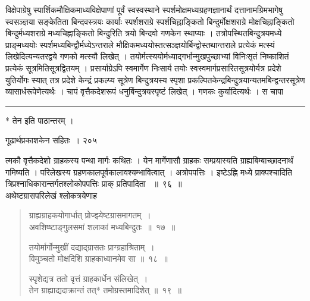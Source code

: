 \documentclass[11pt, openany]{book}
\begin{document}
 विक्षेपाग्रेषु स्पार्शिकमौक्षिकमाध्यविक्षेपाणां पूर्वं स्वस्वस्थाने स्पर्शमोक्षमध्यग्रहणज्ञानार्थं दत्तानामग्रिमभागेषु स्वसञ्ज्ञया सङ्केतिता बिन्दवस्त्रयः कार्याः स्पर्शशराग्रे स्पर्शचिह्नाङ्कितो बिन्दुर्मोक्षशराग्रे मोक्षचिह्नाङ्कितो बिन्दुर्मध्यशराग्रे मध्यचिह्नाङ्कितो बिन्दुरिति त्रयो बिन्दवो गणकेन स्थाप्याः । तत्रोपस्थितबिन्दुत्रयमध्ये प्राङ्मध्ययोः स्पर्शमध्यबिन्द्वौर्मध्येऽन्तराले मौक्षिकमध्ययोस्तत्सञ्ज्ञयोर्बिन्द्वोस्तथान्तराले प्रत्येकं मत्स्यं लिखेदित्यन्यतरद्वये गणको मत्स्यौ लिखेत् । तयोर्मत्स्ययोर्मध्याद्गर्भान्मुखपुच्छाभ्यां विनिःसृतं निष्काशितं प्रत्येकं सूत्रमितिसूत्रद्वितयम् । प्रसार्याग्रेऽपि स्वमार्गेण निःसार्य तयोः स्वस्वमार्गप्रसारितसूत्रयोर्यत्र प्रदेशे युतिर्योगः स्यात् तत्र प्रदेशे केन्द्रं प्रकल्प्य सूत्रेण बिन्दुत्रयस्य स्पृशा प्रकल्पितकेन्द्रबिन्दुत्रयान्यतमबिन्द्वन्तरसूत्रेण व्यासार्धरूपेणेत्यर्थः । चापं वृत्तैकदेशरूपं धनुर्बिन्दुत्रयस्पृष्टं लिखेत् । गणकः कुर्यादित्यर्थः । स चापा\textendash


\noindent \rule{\linewidth}{.5pt}

\begin{center}
 * तेन इति पाठान्तरम् ।
\end{center}

\newpage

 \hspace{3cm} गूढार्थप्रकाशकेन सहितः~। \hfill २०५
\vspace{1cm}


\noindent त्मकौ वृत्तैकदेशो ग्राहकस्य पन्था मार्गः कथितः । येन मार्गेणासौ ग्राहकः सम्प्रयास्यति ग्राह्यबिम्बाच्छादनार्थं गमिष्यति । परिलेखस्य ग्रहणकालपूर्वकालावश्यम्भावित्वात् । अत्रोपपत्तिः । इष्टेऽह्नि मध्ये प्राक्पश्चादिति त्रिप्रश्नाधिकारान्तर्गतश्लोकोपपत्तिः प्राक् प्रतिपादिता ~॥~९६~॥\\
\noindent अथेष्टग्रासपरिलेखं श्लोकत्रयेणाह\textendash



\begin{quote}
{\ssi ग्राह्यग्राहकयोगार्धात् प्रोज्झ्येष्टग्रासमागतम्~।\\
 अवशिष्ष्टाङ्गुलसमां शलाकां मध्यबिन्दुतः~॥~१७~॥

तयोर्मार्गोन्मुखीं दद्याद्ग्रासतः प्राग्ग्रहाश्रिताम्~।\\
विमुञ्चतो मोक्षदिशि ग्राहकाध्वानमेव सा ॥~१८~॥

स्पृशेद्यत्र ततो वृत्तं ग्राहकार्धेन संलिखेत्~।\\
तेन ग्राह्याद्यदाक्रान्तं तत्* तमोग्रस्तमादिशेत् ॥~१९~॥}
\end{quote}
\end{document}
